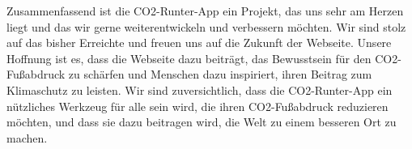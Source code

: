 
Zusammenfassend ist die CO2-Runter-App ein Projekt, das uns sehr am Herzen liegt und das wir gerne weiterentwickeln und verbessern möchten. Wir sind stolz auf das bisher Erreichte und freuen uns auf die Zukunft der Webseite. Unsere Hoffnung ist es, dass die Webseite dazu beiträgt, das Bewusstsein für den CO2-Fußabdruck zu schärfen und Menschen dazu inspiriert, ihren Beitrag zum Klimaschutz zu leisten. Wir sind zuversichtlich, dass die CO2-Runter-App ein nützliches Werkzeug für alle sein wird, die ihren CO2-Fußabdruck reduzieren möchten, und dass sie dazu beitragen wird, die Welt zu einem besseren Ort zu machen.
